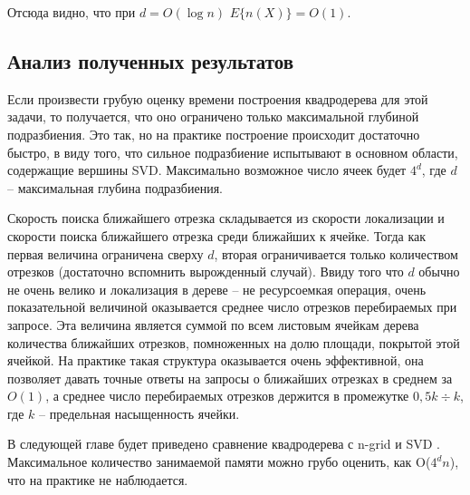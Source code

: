 Отсюда видно, что при $d = O(\log n)$ $E\{n(X)\} = O(1)$.

\subsection{Анализ полученных результатов}
Если произвести грубую оценку времени построения квадродерева для
этой задачи, то получается, что оно ограничено только максимальной глубиной
подразбиения. Это так, но на практике построение происходит достаточно
быстро, в виду того, что сильное подразбиение испытывают в основном
области, содержащие вершины SVD. Максимально возможное число ячеек
будет $4^d$, где $d$ -- максимальная глубина подразбиения.

Скорость поиска ближайшего отрезка складывается из скорости
локализации и скорости поиска ближайшего отрезка среди ближайших к
ячейке. Тогда как первая величина ограничена сверху $d$, вторая ограничивается
только количеством отрезков (достаточно вспомнить вырожденный случай).
Ввиду того что $d$ обычно не очень велико и локализация в дереве -- не
ресурсоемкая операция, очень показательной величиной оказывается среднее
число отрезков перебираемых при запросе. Эта величина является суммой по
всем листовым ячейкам дерева количества ближайших отрезков, помноженных
на долю площади, покрытой этой ячейкой. На практике такая структура
оказывается очень эффективной, она позволяет давать точные ответы на
запросы о ближайших отрезках в среднем за $O(1)$, а среднее число
перебираемых отрезков держится в промежутке $0,5k ÷ k$, где $k$ -- предельная
насыщенность ячейки.

В следующей главе будет приведено сравнение
квадродерева с n-grid \cite{NGRID} и SVD \cite{CGAL}.
Максимальное количество занимаемой памяти можно грубо оценить, как
O($4^{d}n$), что на практике не наблюдается.
